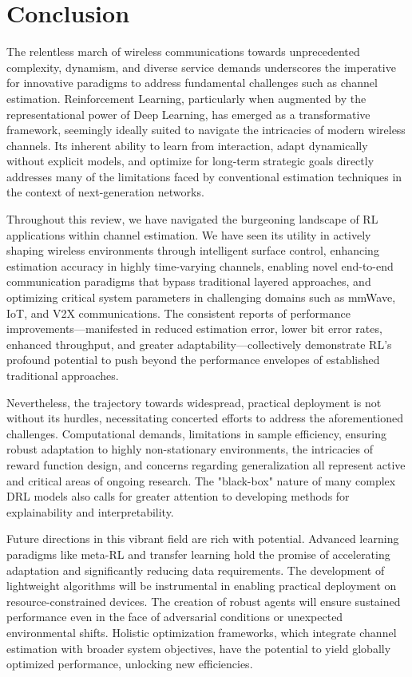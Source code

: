 \documentclass[journal,twocolumn]{IEEEtran}
\begin{document}
\section{Conclusion}

The relentless march of wireless communications towards unprecedented complexity, dynamism, and diverse service demands underscores the imperative for innovative paradigms to address fundamental challenges such as channel estimation. Reinforcement Learning, particularly when augmented by the representational power of Deep Learning, has emerged as a transformative framework, seemingly ideally suited to navigate the intricacies of modern wireless channels. Its inherent ability to learn from interaction, adapt dynamically without explicit models, and optimize for long-term strategic goals directly addresses many of the limitations faced by conventional estimation techniques in the context of next-generation networks.

Throughout this review, we have navigated the burgeoning landscape of RL applications within channel estimation. We have seen its utility in actively shaping wireless environments through intelligent surface control, enhancing estimation accuracy in highly time-varying channels, enabling novel end-to-end communication paradigms that bypass traditional layered approaches, and optimizing critical system parameters in challenging domains such as mmWave, IoT, and V2X communications. The consistent reports of performance improvements—manifested in reduced estimation error, lower bit error rates, enhanced throughput, and greater adaptability—collectively demonstrate RL's profound potential to push beyond the performance envelopes of established traditional approaches.

Nevertheless, the trajectory towards widespread, practical deployment is not without its hurdles, necessitating concerted efforts to address the aforementioned challenges. Computational demands, limitations in sample efficiency, ensuring robust adaptation to highly non-stationary environments, the intricacies of reward function design, and concerns regarding generalization all represent active and critical areas of ongoing research. The "black-box" nature of many complex DRL models also calls for greater attention to developing methods for explainability and interpretability.

Future directions in this vibrant field are rich with potential. Advanced learning paradigms like meta-RL and transfer learning hold the promise of accelerating adaptation and significantly reducing data requirements. The development of lightweight algorithms will be instrumental in enabling practical deployment on resource-constrained devices. The creation of robust agents will ensure sustained performance even in the face of adversarial conditions or unexpected environmental shifts. Holistic optimization frameworks, which integrate channel estimation with broader system objectives, have the potential to yield globally optimized performance, unlocking new efficiencies.
\end{document}
